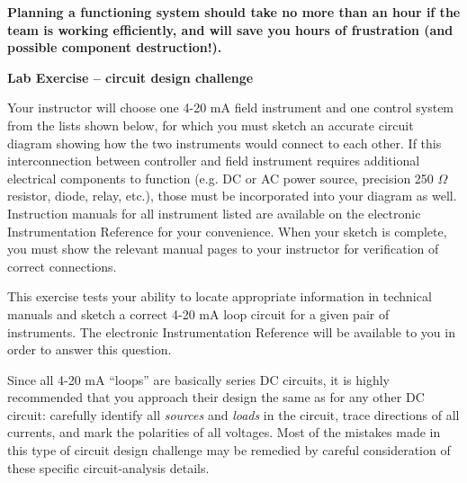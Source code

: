 \vskip 10pt

{\bf Planning a functioning system should take no more than an hour if the team is working efficiently, and will save you hours of frustration (and possible component destruction!).}







\vfil \eject

\noindent
{\bf Lab Exercise -- circuit design challenge}

\vskip 5pt

Your instructor will choose one 4-20 mA field instrument and one control system from the lists shown below, for which you must sketch an accurate circuit diagram showing how the two instruments would connect to each other.  If this interconnection between controller and field instrument requires additional electrical components to function (e.g. DC or AC power source, precision 250 $\Omega$ resistor, diode, relay, etc.), those must be incorporated into your diagram as well.  Instruction manuals for all instrument listed are available on the electronic Instrumentation Reference for your convenience.  When your sketch is complete, you must show the relevant manual pages to your instructor for verification of correct connections.

This exercise tests your ability to locate appropriate information in technical manuals and sketch a correct 4-20 mA loop circuit for a given pair of instruments.  The electronic Instrumentation Reference will be available to you in order to answer this question.

\vskip 10pt

Since all 4-20 mA ``loops'' are basically series DC circuits, it is highly recommended that you approach their design the same as for any other DC circuit: carefully identify all {\it sources} and {\it loads} in the circuit, trace directions of all currents, and mark the polarities of all voltages.  Most of the mistakes made in this type of circuit design challenge may be remedied by careful consideration of these specific circuit-analysis details.


